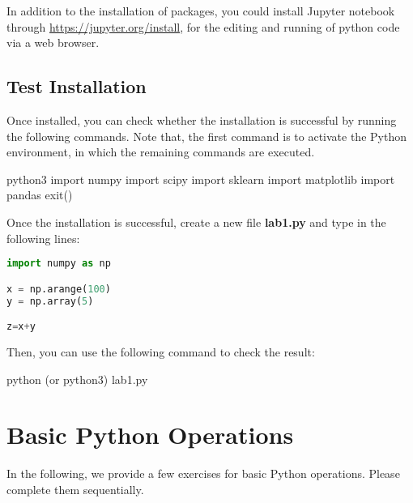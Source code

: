 In addition to the installation of packages, you could install Jupyter notebook through \url{https://jupyter.org/install}, for the editing and running of python code via a web browser. 

\subsection*{Test Installation}

Once installed, you can check whether the installation is successful by running the following commands. Note that, the first command is to activate the Python environment, in which the remaining commands are executed.  

\begin{cmds}
python3
import numpy
import scipy
import sklearn
import matplotlib
import pandas
exit()
\end{cmds}

Once the installation is successful, create a new file \textbf{lab1.py} and type in the following lines: 

\begin{lstlisting}[language=Python]
import numpy as np

x = np.arange(100)
y = np.array(5)

z=x+y
\end{lstlisting}

Then, you can use the following command to check the result: 
\begin{cmds}
python (or python3) lab1.py
\end{cmds}

\section{Basic Python Operations}

In the following, we provide a few exercises for basic Python operations. Please complete them sequentially. 

